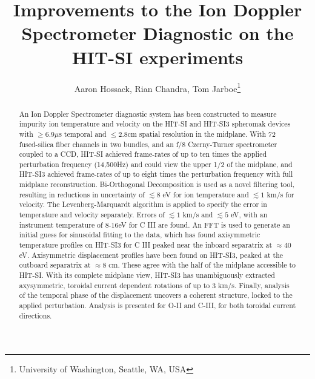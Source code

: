 \documentclass{AIAA}
\begin{document}
\title{Improvements to the Ion Doppler Spectrometer Diagnostic on the HIT-SI experiments}

\author{Aaron Hossack\footnotemark[1], Rian Chandra\footnotemark[1], Tom Jarboe\footnote[1]{University of Washington, Seattle, WA, USA}}

\begin{abstract}
An Ion Doppler Spectrometer diagnostic system has been constructed to measure impurity ion temperature and velocity on the HIT-SI and HIT-SI3 spheromak devices with $\geq6.9\mu$s temporal and $\leq2.8$cm spatial resolution in the midplane. With 72 fused-silica fiber channels in two bundles, and an f/8 Czerny-Turner spectrometer coupled to a CCD, HIT-SI achieved frame-rates of up to ten times the applied perturbation frequency (14,500Hz) and could view the upper 1/2 of the midplane, and HIT-SI3 achieved frame-rates of up to eight times the perturbation frequency with full midplane reconstruction. Bi-Orthogonal Decomposition is used as a novel filtering tool, resulting in reductions in uncertainty of $\lesssim8$ eV for ion temperature  and $\lesssim1$ km/s for velocity. The Levenberg-Marquardt algorithm is applied to specify the error in temperature and velocity separately. Errors of  $\lesssim1$ km/s and $\lesssim5$ eV, with an instrument temperature of 8-16eV for C III are found. An FFT is used to generate an initial guess for sinusoidal fitting to the data, which has found axisymmetric temperature profiles on HIT-SI3 for C III peaked near the inboard separatrix at $\approx40$ eV. Axisymmetric displacement profiles have been found on HIT-SI3, peaked at the outboard separatrix at $\approx8$ cm. These agree with the half of the midplane accessible to HIT-SI. With its complete midplane view, HIT-SI3 has unambiguously extracted axysymmetric, toroidal current dependent rotations of up to 3 km/s. Finally, analysis of the temporal phase of the displacement uncovers a coherent structure, locked to the applied perturbation. Analysis is presented for O-II and C-III, for both toroidal current directions. 
\end{abstract}
\renewcommand{\thefootnote}{\roman{footnote}}
\maketitle


\end{document}
